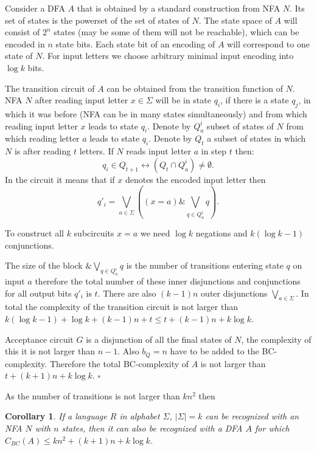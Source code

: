 \documentclass[copyright, creativecommons]{eptcs}
\newcommand{\qed}{$\square$}
\newtheorem{corollary}[theorem]{Corollary}
\newenvironment{proof}[1][Proof]{\begin{trivlist}
\item[\hskip \labelsep {\bfseries #1}]}{\end{trivlist}}
\begin{document}
\begin{proof}
Consider a DFA $A$ that is obtained by a standard construction from NFA $N$. Its set of states is the
powerset of the set of states of $N$. The state space of $A$ will consist of $2^n$ states
(may be some of them will not be reachable), which can be encoded in $n$ state bits. Each state
bit of an encoding of $A$ will correspond to one state of $N$. For input letters we choose arbitrary
minimal input encoding into $\log{k}$ bits.

The transition circuit of $A$ can be obtained from the transition function of $N$.
NFA $N$ after reading input letter $x\in\Sigma$ will be in state $q_i$,
if there is a state $q_j$, in which it was before (NFA can be in many states simultaneously)
and from which reading input letter $x$ leads to state $q_i$. Denote by $Q_{a}^i$ subset of states of $N$ from which
reading letter $a$ leads to state $q_i$. Denote by $Q_t$ a subset of states in which $N$ is after reading $t$ letters.
If $N$ reads input letter $a$ in step $t$ then:
$$q_i \in Q_{t+1} \leftrightarrow (Q_t\cap Q_{a}^i)\neq\emptyset.$$
In the circuit it means that if $x$ denotes the encoded input letter then
$$q'_i = \bigvee_{a\in\Sigma}( (x=a) \& \bigvee_{q\in Q_{a}^i}q).$$


To construct all $k$ subcircuits $x=a$ we need $\log{k}$ negations and $k(\log{k}-1)$ conjunctions.

The size of the block $\&\bigvee_{q\in Q_{a}^i}q$ is the number of transitions entering state $q$ on input $a$ therefore the total number of these inner disjunctions and conjunctions for all output bits $q'_i$ is $t$. There are also $(k-1)n$ outer disjunctions
$\bigvee_{a\in \Sigma}$.
In total the complexity of the transition circuit is not larger than $k(\log k-1)+\log{k}+(k-1)n + t \leq t + (k-1)n + k\log{k}$.

Acceptance circuit $G$ is a disjunction of all the final states
of $N$, the complexity of this it is not larger than $n-1$. Also $b_Q=n$ have to be added to the BC-complexity.
Therefore the total BC-complexity of $A$ is not larger than $t+(k+1)n+k\log{k}$.
\qed
\end{proof}

As the number of transitions is not larger than $kn^2$ then
\begin{corollary}
\label{nedet}
If a language $R$ in alphabet $\Sigma$, $|\Sigma|=k$ can be recognized with an NFA $N$ with $n$ states,
then it can also be recognized
with a DFA $A$ for which
$C_{BC}(A)\leq kn^2+(k+1)n+k\log{k}$.
\end{corollary}
\end{document}
